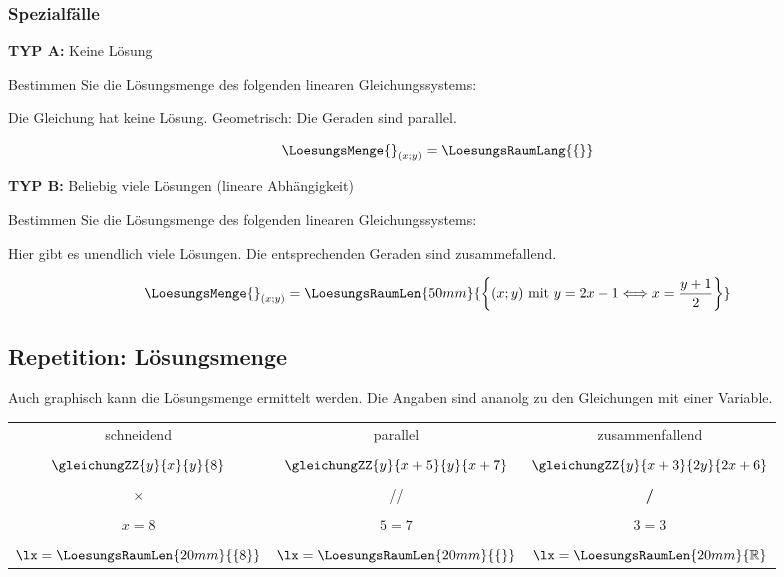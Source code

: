 \subsubsection{Spezialfälle}
\textbf{TYP A:} Keine Lösung

Bestimmen Sie die Lösungsmenge des folgenden linearen Gleichungssystems:



Die Gleichung hat keine Lösung. Geometrisch: Die Geraden sind parallel.

$$\LoesungsMenge{}_{(x;y)} = \LoesungsRaumLang{\{\}}$$

\textbf{TYP B:} Beliebig viele Lösungen (lineare Abhängigkeit)

Bestimmen Sie die Lösungsmenge des folgenden linearen Gleichungssystems:



Hier gibt es unendlich viele Lösungen. Die entsprechenden Geraden sind zusammefallend.

$$\LoesungsMenge{}_{(x;y)} = \LoesungsRaumLen{50mm}{ \left\{(x;y) \text{ mit } y = 2x-1 \Longleftrightarrow x = \frac{y+1}2 \right\} }$$

\newpage

\subsection*{Repetition: Lösungsmenge}
Auch graphisch kann die Lösungsmenge ermittelt werden. Die Angaben
sind ananolg zu den Gleichungen mit einer Variable.
\begin{center}
\begin{tabular}{c|c|c}
schneidend                 & parallel      &
zusammenfallend\\
 & & \\
\vspace{0.5mm}
$\gleichungZZ{y}{x}{y}{8}$ & $\gleichungZZ{y}{x+5}{y}{x+7}$ & $\gleichungZZ{y}{x+3}{2y}{2x+6}$   \\
 & & \\
$\times$                   & //            &   \textbf{/}      \\
 & & \\
$x=8$                      & $5=7$         &  $3=3$            \\
 & & \\
$\lx=\LoesungsRaumLen{20mm}{\{8\}}$                & $\lx=\LoesungsRaumLen{20mm}{\{\}}$    &  $\lx=\LoesungsRaumLen{20mm}{\mathbb{R}}$ \\
\end{tabular} 
\end{center}

